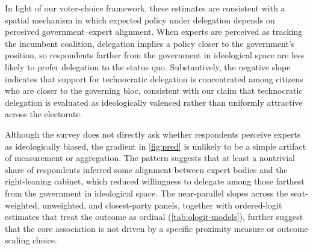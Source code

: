 \documentclass[11pt]{article}\usepackage[]{graphicx}\usepackage[]{xcolor}
\begin{document}
In light of our voter-choice framework, these estimates are consistent with a spatial mechanism in which expected policy under delegation depends on perceived government--expert alignment. When experts are perceived as tracking the incumbent coalition, delegation implies a policy closer to the government's position, so respondents farther from the government in ideological space are less likely to prefer delegation to the status quo. Substantively, the negative slope indicates that support for technocratic delegation is concentrated among citizens who are closer to the governing bloc, consistent with our claim that technocratic delegation is evaluated as ideologically valenced rather than uniformly attractive across the electorate.

Although the survey does not directly ask whether respondents perceive experts as ideologically biased, the gradient in \autoref{fig:pred} is unlikely to be a simple artifact of measurement or aggregation. The pattern suggests that at least a nontrivial share of respondents inferred some alignment between expert bodies and the right-leaning cabinet, which reduced willingness to delegate among those farthest from the government in ideological space. The near-parallel slopes across the seat-weighted, unweighted, and closest-party panels, together with ordered-logit estimates that treat the outcome as ordinal (\autoref{tab:ologit-models}), further suggest that the core association is not driven by a specific proximity measure or outcome scaling choice.


\end{document}
